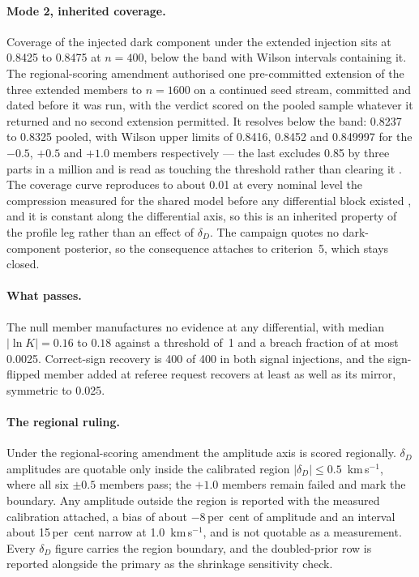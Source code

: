 \documentclass[11pt]{article}
\newcommand{\dD}{\ensuremath{\delta_D}}
\begin{document}
\paragraph{Mode 2, inherited coverage.} Coverage of the injected dark component under the extended injection sits at 0.8425 to 0.8475 at $n = 400$, below the band with Wilson intervals containing it. The regional-scoring amendment authorised one pre-committed extension of the three extended members to $n = 1600$ on a continued seed stream, committed and dated before it was run, with the verdict scored on the pooled sample whatever it returned and no second extension permitted. It resolves below the band: 0.8237 to 0.8325 pooled, with Wilson upper limits of 0.8416, 0.8452 and 0.849997 for the $-0.5$, $+0.5$ and $+1.0$ members respectively — the last excludes 0.85 by three parts in a million and is read as touching the threshold rather than clearing it \citep{AXIGatesReport2026}. The coverage curve reproduces to about 0.01 at every nominal level the compression measured for the shared model before any differential block existed \citep{HCalReport2026}, and it is constant along the differential axis, so this is an inherited property of the profile leg rather than an effect of \dD{}. The campaign quotes no dark-component posterior, so the consequence attaches to criterion~5, which stays closed.

\paragraph{What passes.} The null member manufactures no evidence at any differential, with median $|\ln K| = 0.16$ to $0.18$ against a threshold of~1 and a breach fraction of at most 0.0025. Correct-sign recovery is 400 of 400 in both signal injections, and the sign-flipped member added at referee request recovers at least as well as its mirror, symmetric to 0.025.

\paragraph{The regional ruling.} Under the regional-scoring amendment the amplitude axis is scored regionally. \dD{} amplitudes are quotable only inside the calibrated region $|\dD| \leq 0.5$~km\,s$^{-1}$, where all six $\pm0.5$ members pass; the $+1.0$ members remain failed and mark the boundary. Any amplitude outside the region is reported with the measured calibration attached, a bias of about $-8$\,per~cent of amplitude and an interval about 15\,per~cent narrow at 1.0~km\,s$^{-1}$, and is not quotable as a measurement. Every \dD{} figure carries the region boundary, and the doubled-prior row is reported alongside the primary as the shrinkage sensitivity check.
\end{document}
